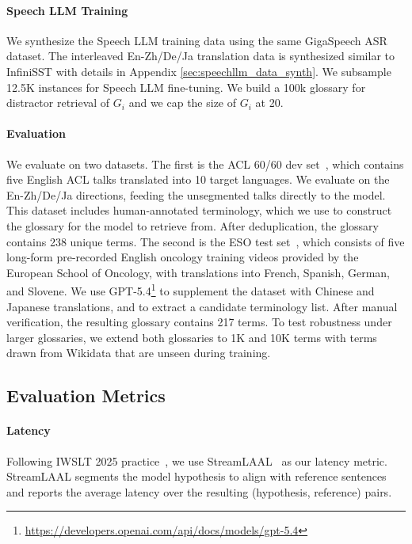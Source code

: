 \paragraph{Speech LLM Training}
We synthesize the Speech LLM training data using the same GigaSpeech ASR dataset. The interleaved En-Zh/De/Ja translation data is synthesized similar to InfiniSST with details in Appendix \ref{sec:speechllm_data_synth}. 
We subsample 12.5K instances for Speech LLM fine-tuning. We build a 100k glossary for distractor retrieval of $G_i$ and we cap the size of $G_i$ at 20. 

\paragraph{Evaluation} We evaluate on two datasets. The first is the ACL 60/60 dev set~\citep{salesky-etal-2023-evaluating}, which contains five English ACL talks translated into 10 target languages. We evaluate on the En-Zh/De/Ja directions, feeding the unsegmented talks directly to the model. This dataset includes human-annotated terminology, which we use to construct the glossary for the model to retrieve from. After deduplication, the glossary contains 238 unique terms. The second is the ESO test set~\citep{eso_dataset}, which consists of five long-form pre-recorded English oncology training videos provided by the European School of Oncology, with translations into French, Spanish, German, and Slovene. We use GPT-5.4\footnote{\url{https://developers.openai.com/api/docs/models/gpt-5.4}} to supplement the dataset with Chinese and Japanese translations, and to extract a candidate terminology list. After manual verification, the resulting glossary contains 217 terms. To test robustness under larger glossaries, we extend both glossaries to 1K and 10K terms with terms drawn from Wikidata that are unseen during training.

\subsection{Evaluation Metrics}
\label{sec:evaluation}

\paragraph{Latency}
Following IWSLT 2025 practice~\citep{agostinelli-etal-2025-findings}, we use StreamLAAL~\citep{papi-etal-2024-streamatt} as our latency metric. StreamLAAL segments the model hypothesis to align with reference sentences and reports the average latency over the resulting (hypothesis, reference) pairs.

